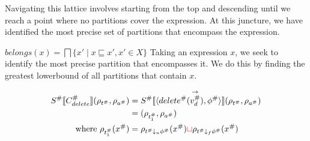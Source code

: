 Navigating this lattice involves starting from the top and descending until we reach a point where no partitions cover the expression. At this juncture, we have identified the most precise set of partitions that encompass the expression.

$ belongs(x)=\bigsqcap\{x' \mid x \sqsubseteq x', x' \in X\} $
Taking an expression $x$, we seek to identify the most precise partition that encompasses it. We do this by finding the greatest lowerbound of all partitions that contain $x$.


\begin{align*}
    S^\# \llbracket C^\#_{delete} \rrbracket(\rho_{t^\#}, \rho_{a^\#})
    &= S^\# \llbracket \langle delete^\#(\overset{\rightarrow}{v_d^\#}), \phi^\# \rangle \rrbracket (\rho_{t^\#}, \rho_{a^\#}) \\
    &= (\rho_{t^\#_1}, \rho_{a^\#}) \\
    \text{where } \rho_{t^\#_1}(x^\#) &= \rho_{t^\# \downarrow_u \phi^\#}(x^\#) \textcolor{red}{\sqcup} \rho_{t^\# \downarrow_f \phi^\#}(x^\#)
\end{align*}

